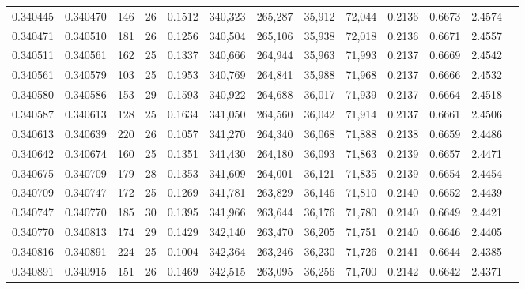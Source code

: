 \begin{tabular}{rrrrrrrrrrrrr}
0.340445 & 0.340470 &   146 &  26 &                                     0.1512 & 340,323 & 265,287 &  35,912 &  72,044 & 0.2136 & 0.6673 & 2.4574 \\
0.340471 & 0.340510 &   181 &  26 &                                     0.1256 & 340,504 & 265,106 &  35,938 &  72,018 & 0.2136 & 0.6671 & 2.4557 \\
0.340511 & 0.340561 &   162 &  25 &                                     0.1337 & 340,666 & 264,944 &  35,963 &  71,993 & 0.2137 & 0.6669 & 2.4542 \\
0.340561 & 0.340579 &   103 &  25 &                                     0.1953 & 340,769 & 264,841 &  35,988 &  71,968 & 0.2137 & 0.6666 & 2.4532 \\
0.340580 & 0.340586 &   153 &  29 &                                     0.1593 & 340,922 & 264,688 &  36,017 &  71,939 & 0.2137 & 0.6664 & 2.4518 \\
0.340587 & 0.340613 &   128 &  25 &                                     0.1634 & 341,050 & 264,560 &  36,042 &  71,914 & 0.2137 & 0.6661 & 2.4506 \\
0.340613 & 0.340639 &   220 &  26 &                                     0.1057 & 341,270 & 264,340 &  36,068 &  71,888 & 0.2138 & 0.6659 & 2.4486 \\
0.340642 & 0.340674 &   160 &  25 &                                     0.1351 & 341,430 & 264,180 &  36,093 &  71,863 & 0.2139 & 0.6657 & 2.4471 \\
0.340675 & 0.340709 &   179 &  28 &                                     0.1353 & 341,609 & 264,001 &  36,121 &  71,835 & 0.2139 & 0.6654 & 2.4454 \\
0.340709 & 0.340747 &   172 &  25 &                                     0.1269 & 341,781 & 263,829 &  36,146 &  71,810 & 0.2140 & 0.6652 & 2.4439 \\
0.340747 & 0.340770 &   185 &  30 &                                     0.1395 & 341,966 & 263,644 &  36,176 &  71,780 & 0.2140 & 0.6649 & 2.4421 \\
0.340770 & 0.340813 &   174 &  29 &                                     0.1429 & 342,140 & 263,470 &  36,205 &  71,751 & 0.2140 & 0.6646 & 2.4405 \\
0.340816 & 0.340891 &   224 &  25 &                                     0.1004 & 342,364 & 263,246 &  36,230 &  71,726 & 0.2141 & 0.6644 & 2.4385 \\
0.340891 & 0.340915 &   151 &  26 &                                     0.1469 & 342,515 & 263,095 &  36,256 &  71,700 & 0.2142 & 0.6642 & 2.4371 \\

\end{tabular}

